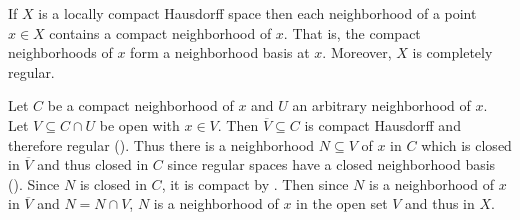 \documentclass[letterpaper, 11pt, oneside]{book}
\begin{document}
\clearpage

\begin{thrm}\label{thrm: locally_comp_Haus_comp_reg}
  If $X$ is a locally compact Hausdorff space then each neighborhood of a point $x \in X$ contains a compact neighborhood of $x$.
  That is, the compact neighborhoods of $x$ form a neighborhood basis at $x$.
  Moreover, $X$ is completely regular.
\end{thrm}
\begin{pf}
  Let $C$ be a compact neighborhood of $x$ and $U$ an arbitrary neighborhood of $x$.
  Let $V \subseteq C \cap U$ be open with $x \in V$.
  Then $\overline{V} \subseteq C$ is compact Hausdorff and therefore regular ().
  Thus there is a neighborhood $N \subseteq V$ of $x$ in $C$ which is closed in $\overline{V}$ and thus closed in $C$ since regular spaces have a closed neighborhood basis ().
  Since $N$ is closed in $C$, it is compact by .
  Then since $N$ is a neighborhood of $x$ in $\overline{V}$ and $N = N \cap V$, $N$ is a neighborhood of $x$ in the open set $V$ and thus in $X$.
\end{pf}
\end{document}
